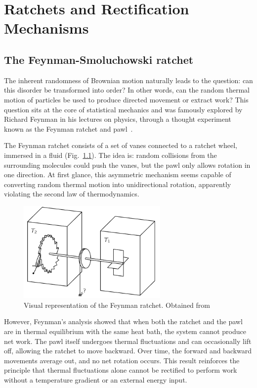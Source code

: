 \chapter{Ratchets and Rectification Mechanisms}
\label{ch:ratchetsandrectificationmechanisms}

\section{The Feynman-Smoluchowski ratchet}

The inherent randomness of Brownian motion naturally leads to the question: can this disorder be transformed into order? In other words, can the random thermal motion of particles be used to produce directed movement or extract work? This question sits at the core of statistical mechanics and was famously explored by Richard Feynman in his lectures on physics, through a thought experiment known as the Feynman ratchet and pawl~\cite{feynman1963feynman}.

The Feynman ratchet consists of a set of vanes connected to a ratchet wheel, immersed in a fluid (Fig.~\ref{fig:feynmanratchet}). The idea is: random collisions from the surrounding molecules could push the vanes, but the pawl only allows rotation in one direction. At first glance, this asymmetric mechanism seems capable of converting random thermal motion into unidirectional rotation, apparently violating the second law of thermodynamics.
\begin{figure}
  \begin{center}
    \includegraphics[width=0.65\textwidth]{figures/feynmanratchet.png}
  \end{center}
  \caption[Feynman ratchet]{Visual representation of the Feynman ratchet. Obtained from \cite{feynman1963feynman}}\label{fig:feynmanratchet}
\end{figure}


However, Feynman's analysis showed that when both the ratchet and the pawl are in thermal equilibrium with the same heat bath, the system cannot produce net work. The pawl itself undergoes thermal fluctuations and can occasionally lift off, allowing the ratchet to move backward. Over time, the forward and backward movements average out, and no net rotation occurs. This result reinforces the principle that thermal fluctuations alone cannot be rectified to perform work without a temperature gradient or an external energy input.

